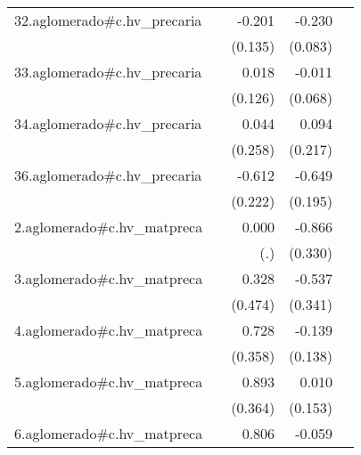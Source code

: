 {\begin{longtable}{l*{4}{D{.}{.}{-1}}}
\addlinespace
32.aglomerado#c.hv\_precaria&                     &      -0.201         &      -0.230\sym{**} &                     \\
            &                     &     (0.135)         &     (0.083)         &                     \\
\addlinespace
33.aglomerado#c.hv\_precaria&                     &       0.018         &      -0.011         &                     \\
            &                     &     (0.126)         &     (0.068)         &                     \\
\addlinespace
34.aglomerado#c.hv\_precaria&                     &       0.044         &       0.094         &                     \\
            &                     &     (0.258)         &     (0.217)         &                     \\
\addlinespace
36.aglomerado#c.hv\_precaria&                     &      -0.612\sym{**} &      -0.649\sym{***}&                     \\
            &                     &     (0.222)         &     (0.195)         &                     \\
\addlinespace
2.aglomerado#c.hv\_matpreca&                     &       0.000         &      -0.866\sym{**} &                     \\
            &                     &         (.)         &     (0.330)         &                     \\
\addlinespace
3.aglomerado#c.hv\_matpreca&                     &       0.328         &      -0.537         &                     \\
            &                     &     (0.474)         &     (0.341)         &                     \\
\addlinespace
4.aglomerado#c.hv\_matpreca&                     &       0.728\sym{*}  &      -0.139         &                     \\
            &                     &     (0.358)         &     (0.138)         &                     \\
\addlinespace
5.aglomerado#c.hv\_matpreca&                     &       0.893\sym{*}  &       0.010         &                     \\
            &                     &     (0.364)         &     (0.153)         &                     \\
\addlinespace
6.aglomerado#c.hv\_matpreca&                     &       0.806         &      -0.059         &                     \\

\end{longtable}}
